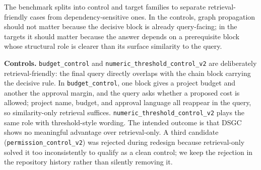 \documentclass[10pt]{article}
\begin{document}
The benchmark splits into control and target families to separate retrieval-friendly cases from dependency-sensitive ones. In the controls, graph propagation should not matter because the decisive block is already query-facing; in the targets it should matter because the answer depends on a prerequisite block whose structural role is clearer than its surface similarity to the query.

\textbf{Controls.} \texttt{budget\_control} and \texttt{numeric\_threshold\_control\_v2} are deliberately retrieval-friendly: the final query directly overlaps with the chain block carrying the decisive rule. In \texttt{budget\_control}, one block gives a project budget and another the approval margin, and the query asks whether a proposed cost is allowed; project name, budget, and approval language all reappear in the query, so similarity-only retrieval suffices. \texttt{numeric\_threshold\_control\_v2} plays the same role with threshold-style wording. The intended outcome is that DSGC shows no meaningful advantage over retrieval-only. A third candidate (\texttt{permission\_control\_v2}) was rejected during redesign because retrieval-only solved it too inconsistently to qualify as a clean control; we keep the rejection in the repository history rather than silently removing it.
\end{document}
